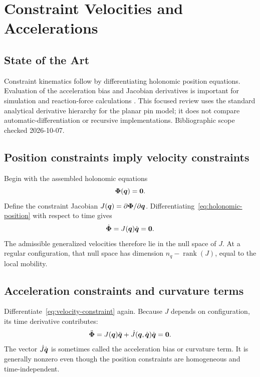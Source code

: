 \documentclass[../main.tex]{subfiles}
\begin{document}
\chapter{Constraint Velocities and Accelerations}
\label{chap:constraint-kinematics}

\section{State of the Art}
Constraint kinematics follow by differentiating holonomic position equations. Evaluation of the acceleration bias and Jacobian derivatives is important for simulation and reaction-force calculations \cite{shabana2013dynamics}. This focused review uses the standard analytical derivative hierarchy for the planar pin model; it does not compare automatic-differentiation or recursive implementations. Bibliographic scope checked 2026-10-07.

\section{Position constraints imply velocity constraints}

Begin with the assembled holonomic equations
\begin{equation}
	\boldsymbol{\Phi}(\boldsymbol{q})=\boldsymbol{0}.
	\label{eq:holonomic-position}
\end{equation}
Define the constraint Jacobian $J(\boldsymbol{q})=\partial\boldsymbol{\Phi}/\partial\boldsymbol{q}$. Differentiating~\eqref{eq:holonomic-position} with respect to time gives
\begin{equation}
	\dot{\boldsymbol{\Phi}}=J(\boldsymbol{q})\dot{\boldsymbol{q}}=\boldsymbol{0}.
	\label{eq:velocity-constraint}
\end{equation}
The admissible generalized velocities therefore lie in the null space of $J$. At a regular configuration, that null space has dimension $n_q-\operatorname{rank}(J)$, equal to the local mobility.

\section{Acceleration constraints and curvature terms}

Differentiate~\eqref{eq:velocity-constraint} again. Because $J$ depends on configuration, its time derivative contributes:
\begin{equation}
	\ddot{\boldsymbol{\Phi}}
	=J(\boldsymbol{q})\ddot{\boldsymbol{q}}
	 +\dot J(\boldsymbol{q},\dot{\boldsymbol{q}})\dot{\boldsymbol{q}}
	=\boldsymbol{0}.
	\label{eq:acceleration-constraint}
\end{equation}
The vector $\dot J\dot{\boldsymbol{q}}$ is sometimes called the acceleration bias or curvature term. It is generally nonzero even though the position constraints are homogeneous and time-independent.
\end{document}
